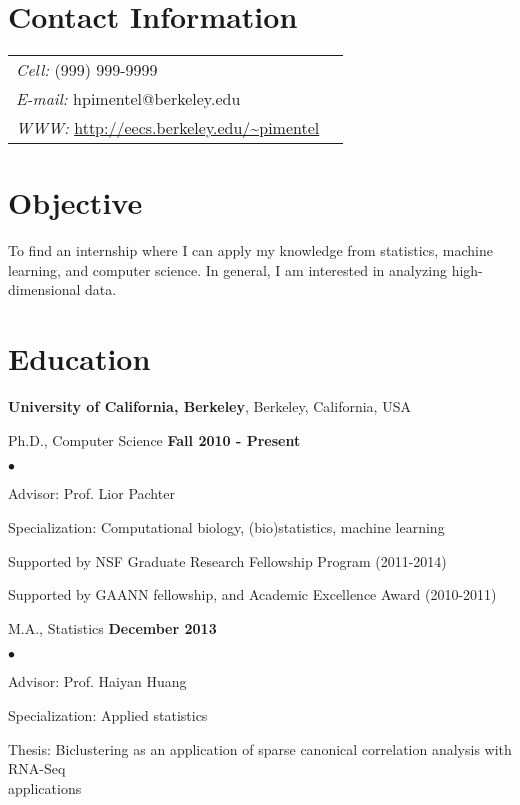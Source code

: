 \documentclass[margin,line]{res}
\newenvironment{list2}{
  \begin{list}{$\bullet$}{%
      \setlength{\itemsep}{0in}
      \setlength{\parsep}{0in} \setlength{\parskip}{0in}
      \setlength{\topsep}{0in} \setlength{\partopsep}{0in}
      \setlength{\leftmargin}{0.2in}}}{\end{list}}
\begin{document}

\begin{resume}
\section{\sc Contact Information}
\vspace{.05in}
\begin{tabular}{@{}p{4in}p{2in}}
 {\it Cell:}  (999) 999-9999 & \\
 {\it E-mail:}  hpimentel@berkeley.edu & \\
 {\it WWW:} \url{http://eecs.berkeley.edu/~pimentel} &
\end{tabular}

\section{\sc Objective}
To find an internship where I can apply my knowledge from statistics, machine
learning, and computer science. In general, I am interested in analyzing
high-dimensional data.

\section{\sc Education}
{\bf University of California, Berkeley}, Berkeley, California, USA

\vspace{-.3cm}
Ph.D., Computer Science \hfill {\bf
 Fall 2010 - Present}\\
\vspace{-.45cm}
\begin{list2}
\vspace*{1mm}
\item Advisor: Prof. Lior Pachter
\item Specialization: Computational biology, (bio)statistics, machine learning
\item Supported by NSF Graduate Research Fellowship Program (2011-2014)
\item Supported by GAANN fellowship, and Academic Excellence Award (2010-2011)
\end{list2}


M.A., Statistics \hfill {\bf
 December 2013}\\
\vspace{-.45cm}
\begin{list2}
\vspace*{1mm}
\item Advisor: Prof. Haiyan Huang
\item Specialization: Applied statistics
\item Thesis: Biclustering as an application of sparse canonical correlation analysis with RNA-Seq \\applications
\end{list2}




\end{resume}
\end{document}
